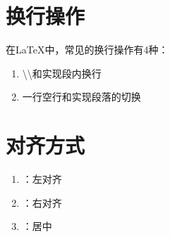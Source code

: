 \section{换行操作}
在\LaTeX 中，常见的换行操作有4种：
\begin{enumerate}
	\item
	\textbackslash\textbackslash 和实现段内换行
	\item
	一行空行和实现段落的切换 
\end{enumerate}
\section{对齐方式}
\begin{enumerate}
	\item
	 ：左对齐
	\item
	：右对齐
	\item
	：居中 
\end{enumerate}

